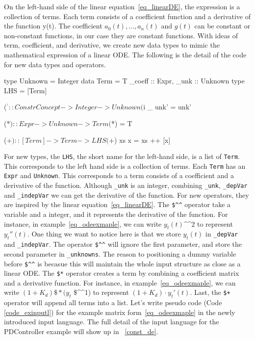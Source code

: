 On the left-hand side of the linear equation~\ref{eq_linearDE}, the expression is a collection of terms. Each term consists of a coefficient function and a derivative of the function y(t). The coefficient $a_0(t), \dots, a_n(t)$ and $g(t)$ can be constant or non-constant functions, in our case they are constant functions. With ideas of term, coefficient, and derivative, we create new data types to mimic the mathematical expression of a linear ODE. The following is the detail of the code for new data types and operators.

\begin{haskell1}
type Unknown = Integer
data Term = T{
	_coeff :: Expr,
	_unk :: Unknown
}
type LHS = [Term]

($^^) :: ConstrConcept -> Integer -> Unknown
($^^) _ unk' = unk'

($*) :: Expr -> Unknown -> Term
($*) = T

($+) :: [Term] -> Term -> LHS
($+) xs x  = xs ++ [x]
\end{haskell1}

For new types, the \verb|LHS|, the short name for the left-hand side, is a list of \verb|Term|. This corresponds to the left hand side is a collection of terms. Each \verb|Term| has an \verb|Expr| and \verb|Unknown|. This corresponds to a term consists of a coefficient and a derivative of the function. Although \verb|_unk| is an integer, combining \verb|_unk|, \verb|_depVar| and \verb|_indepVar| we can get the derivative of the function. For new operators, they are inspired by the linear equation~\ref{eq_linearDE}. The \verb|$^^| operator take a variable and a integer, and it represents the derivative of the function. For instance, in example~\ref{eq_odeexmaple}, we can write $y_t(t)$\^{}\^{}2 to represent $y_t''(t)$. One thing we want to notice here is that we store $y_t(t)$ in \verb|_depVar| and \verb|_indepVar|. The operator \verb|$^^| will ignore the first parameter, and store the second parameter in \verb|_unknowns|. The reason to positioning a dummy variable before \verb|$^^| is becasue this will maintain the whole input structure as close as a linear ODE. The \verb|$*| operator creates a term by combining a coefficient matrix and a derivative function. For instance, in example~\ref{eq_odeexmaple}, we can write $(1 + K_d) \$* (y_t$ \$\^{}\^{}1) to represent $(1 + K_d) \cdot y_t'(t)$. Last, the \verb|$+| operator will append all terms into a list. Let's write pseudo code (Code \ref{code_exinputl}) for the example matrix form~\ref{eq_odeexmaple} in the newly introduced input language. The full detail of the input language for the PDController example will show up in ~\ref{const_de}.

